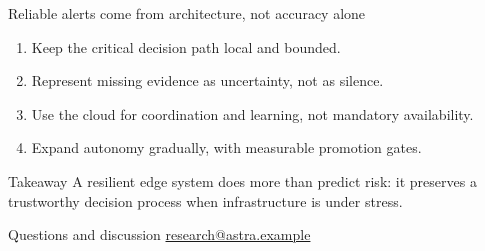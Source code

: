 \begin{frame}{Reliable alerts come from architecture, not accuracy alone}
  \begin{enumerate}
    \item Keep the critical decision path local and bounded.
    \item Represent missing evidence as uncertainty, not as silence.
    \item Use the cloud for coordination and learning, not mandatory availability.
    \item Expand autonomy gradually, with measurable promotion gates.
  \end{enumerate}

  \vfill
  \begin{block}{Takeaway}
    A resilient edge system does more than predict risk: it preserves a trustworthy decision process when infrastructure is under stress.
  \end{block}

  \vspace{0.22cm}
  \centering
  \small Questions and discussion \quad\textbullet\quad
  \href{mailto:research@astra.example}{research@astra.example}
\end{frame}
